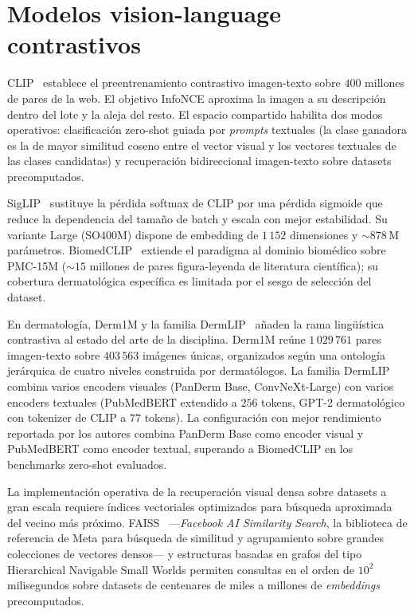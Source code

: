 \section{Modelos vision-language contrastivos}
\label{sec:vision-language}

CLIP~\cite{clip2021} establece el preentrenamiento contrastivo
imagen-texto sobre $400$ millones de pares de la web. El objetivo
InfoNCE aproxima la imagen a su descripción dentro del lote y la
aleja del resto. El espacio compartido habilita dos modos
operativos: clasificación zero-shot guiada por \emph{prompts}
textuales (la clase ganadora es la de mayor similitud coseno entre
el vector visual y los vectores textuales de las clases candidatas)
y recuperación bidireccional imagen-texto sobre datasets
precomputados.

SigLIP~\cite{siglip2023} sustituye la pérdida softmax de CLIP por
una pérdida sigmoide que reduce la dependencia del tamaño de batch y
escala con mejor estabilidad. Su variante Large
(SO400M) dispone de embedding de $1\,152$ dimensiones y
$\sim 878$\,M parámetros. BiomedCLIP~\cite{biomedclip} extiende
el paradigma al dominio biomédico sobre PMC-15M
($\sim 15$ millones de pares figura-leyenda de literatura
científica); su cobertura dermatológica específica es limitada por
el sesgo de selección del dataset.

En dermatología, Derm1M y la familia DermLIP~\cite{derm1m} añaden la
rama lingüística contrastiva al estado del arte de la disciplina.
Derm1M reúne $1\,029\,761$ pares imagen-texto sobre
$403\,563$ imágenes únicas, organizados según una ontología
jerárquica de cuatro niveles construida por dermatólogos. La familia
DermLIP combina varios encoders visuales (PanDerm Base,
ConvNeXt-Large) con varios encoders textuales (PubMedBERT extendido
a $256$ tokens, GPT-2 dermatológico con tokenizer de CLIP a
$77$ tokens). La configuración con mejor rendimiento reportada
por los autores combina PanDerm Base como encoder visual y
PubMedBERT como encoder textual, superando a BiomedCLIP en los
benchmarks zero-shot evaluados.

La implementación operativa de la recuperación visual densa sobre
datasets a gran escala requiere índices vectoriales optimizados para
búsqueda aproximada del vecino más próximo. FAISS~\cite{faiss2019}
---\emph{Facebook AI Similarity Search}, la biblioteca de referencia
de Meta para búsqueda de similitud y agrupamiento sobre grandes
colecciones de vectores densos--- y estructuras basadas en grafos del
tipo Hierarchical Navigable Small Worlds permiten consultas en el
orden de $10^2$
milisegundos sobre datasets de centenares de miles a millones de
\emph{embeddings} precomputados.


